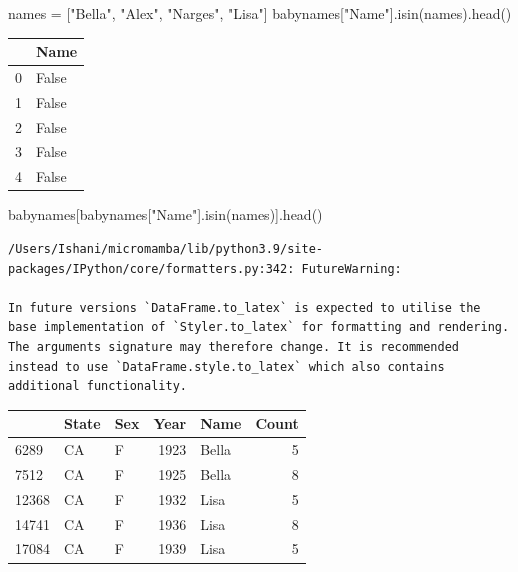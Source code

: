 \documentclass[
  letterpaper,
  DIV=11,
  numbers=noendperiod]{scrreprt}
\newenvironment{Shaded}{\begin{snugshade}}{\end{snugshade}}
\newcommand{\NormalTok}[1]{\textcolor[rgb]{0.00,0.23,0.31}{#1}}
\newcommand{\OperatorTok}[1]{\textcolor[rgb]{0.37,0.37,0.37}{#1}}
\newcommand{\StringTok}[1]{\textcolor[rgb]{0.13,0.47,0.30}{#1}}
\begin{document}
\begin{Shaded}
\begin{Highlighting}[]
\NormalTok{names }\OperatorTok{=}\NormalTok{ [}\StringTok{"Bella"}\NormalTok{, }\StringTok{"Alex"}\NormalTok{, }\StringTok{"Narges"}\NormalTok{, }\StringTok{"Lisa"}\NormalTok{]}
\NormalTok{babynames[}\StringTok{"Name"}\NormalTok{].isin(names).head()}
\end{Highlighting}
\end{Shaded}

\begin{tabular}{ll}
\toprule
{} &   Name \\
\midrule
0 &  False \\
1 &  False \\
2 &  False \\
3 &  False \\
4 &  False \\
\bottomrule
\end{tabular}

\begin{Shaded}
\begin{Highlighting}[]
\NormalTok{babynames[babynames[}\StringTok{"Name"}\NormalTok{].isin(names)].head()}
\end{Highlighting}
\end{Shaded}

\begin{verbatim}
/Users/Ishani/micromamba/lib/python3.9/site-packages/IPython/core/formatters.py:342: FutureWarning:

In future versions `DataFrame.to_latex` is expected to utilise the base implementation of `Styler.to_latex` for formatting and rendering. The arguments signature may therefore change. It is recommended instead to use `DataFrame.style.to_latex` which also contains additional functionality.
\end{verbatim}

\begin{tabular}{lllrlr}
\toprule
{} & State & Sex &  Year &   Name &  Count \\
\midrule
6289  &    CA &   F &  1923 &  Bella &      5 \\
7512  &    CA &   F &  1925 &  Bella &      8 \\
12368 &    CA &   F &  1932 &   Lisa &      5 \\
14741 &    CA &   F &  1936 &   Lisa &      8 \\
17084 &    CA &   F &  1939 &   Lisa &      5 \\
\bottomrule
\end{tabular}
\end{document}
